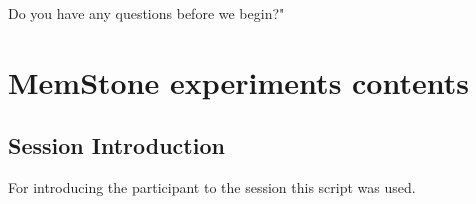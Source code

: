\documentclass[mscthesis]{usiinfthesis}
\begin{document}
Do you have any questions before we begin?"


\label{sec:data}


\label{sec:sus}

\chapter{MemStone experiments contents}




\label{ses:con}



\label{ses:pre}

\section{Session Introduction}
\label{ses:intro}
For introducing the participant to the session this script was used.
\linebreak
\end{document}
